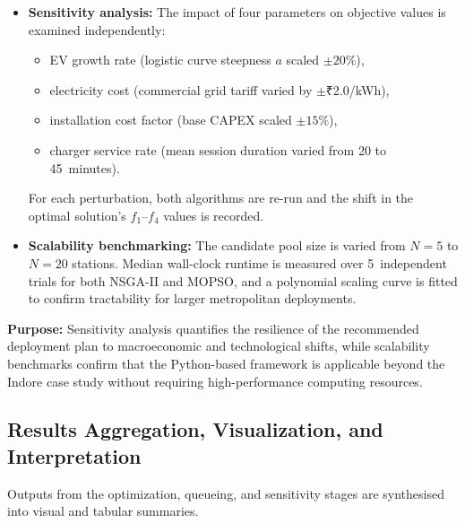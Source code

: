 \begin{itemize}
    \item \textbf{Sensitivity analysis:} The impact of four
          parameters on objective values is examined independently:
          \begin{itemize}
              \item EV growth rate (logistic curve steepness $a$
                    scaled $\pm 20\%$),
              \item electricity cost (commercial grid tariff
                    varied by $\pm$₹2.0/kWh),
              \item installation cost factor (base CAPEX scaled
                    $\pm 15\%$),
              \item charger service rate (mean session duration
                    varied from 20 to 45~minutes).
          \end{itemize}
          For each perturbation, both algorithms are re-run and the
          shift in the optimal solution's $f_1$--$f_4$ values is
          recorded.
    \item \textbf{Scalability benchmarking:} The candidate pool
          size is varied from $N = 5$ to $N = 20$ stations.
          Median wall-clock runtime is measured over 5~independent
          trials for both NSGA-II and MOPSO, and a polynomial
          scaling curve is fitted to confirm tractability for
          larger metropolitan deployments.
\end{itemize}

\noindent\textbf{Purpose:} Sensitivity analysis quantifies the
resilience of the recommended deployment plan to macroeconomic
and technological shifts, while scalability benchmarks confirm
that the Python-based framework is applicable beyond the Indore
case study without requiring high-performance computing resources.

\subsection{Results Aggregation, Visualization, and Interpretation}
Outputs from the optimization, queueing, and sensitivity stages
are synthesised into visual and tabular summaries.

